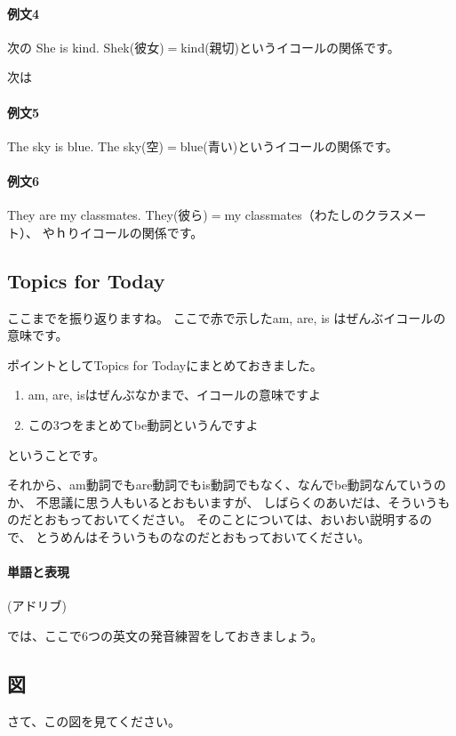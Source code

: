 \documentclass[book,jafontscale=0.9247]{jlreq}
\begin{document}
\paragraph{例文4}
次の
She is kind.
Shek(彼女)$=$kind(親切)というイコールの関係です。

次は
\paragraph{例文5}
The sky is blue.
The sky(空)$=$blue(青い)というイコールの関係です。

\paragraph{例文6}
They are my classmates.
They(彼ら)$=$my classmates（わたしのクラスメート）、
やｈりイコールの関係です。

\bigskip

\subsection{Topics for Today}
ここまでを振り返りますね。
ここで赤で示したam, are, is はぜんぶイコールの意味です。


ポイントとしてTopics for Todayにまとめておきました。

\begin{enumerate}
 \item am, are, isはぜんぶなかまで、イコールの意味ですよ
 \item この3つをまとめてbe動詞というんですよ
\end{enumerate}
ということです。

それから、am動詞でもare動詞でもis動詞でもなく、なんでbe動詞なんていうのか、
不思議に思う人もいるとおもいますが、
しばらくのあいだは、そういうものだとおもっておいてください。
そのことについては、おいおい説明するので、
とうめんはそういうものなのだとおもっておいてください。

\paragraph{単語と表現} \mbox{}

(アドリブ)

では、ここで6つの英文の発音練習をしておきましょう。


{\large \ComputerMouse}
\subsection{図}
さて、この図を見てください。
\end{document}
